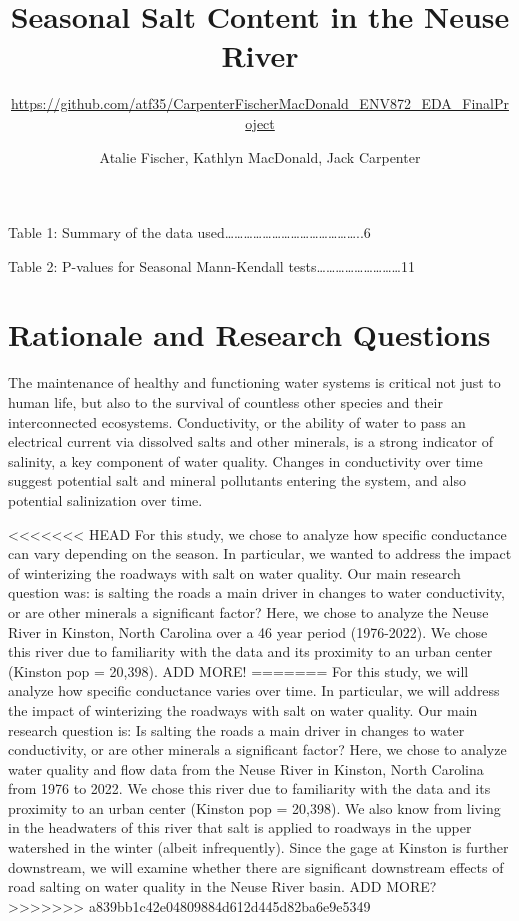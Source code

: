 \documentclass[
  12pt,
]{article}
\title{Seasonal Salt Content in the Neuse River}
\subtitle{\url{https://github.com/atf35/CarpenterFischerMacDonald_ENV872_EDA_FinalProject}}
\author{Atalie Fischer, Kathlyn MacDonald, Jack Carpenter}
\date{}
\begin{document}
\maketitle

{
\setcounter{tocdepth}{2}
\tableofcontents
}
\newpage

\listoftables

Table 1: Summary of the data
used\ldots\ldots\ldots\ldots\ldots\ldots\ldots\ldots\ldots\ldots\ldots\ldots\ldots\ldots..6

Table 2: P-values for Seasonal Mann-Kendall
tests\ldots\ldots\ldots\ldots\ldots\ldots\ldots\ldots\ldots11 \newpage

\listoffigures 
\newpage

\hypertarget{rationale-and-research-questions}{%
\section{Rationale and Research
Questions}\label{rationale-and-research-questions}}

The maintenance of healthy and functioning water systems is critical not
just to human life, but also to the survival of countless other species
and their interconnected ecosystems. Conductivity, or the ability of
water to pass an electrical current via dissolved salts and other
minerals, is a strong indicator of salinity, a key component of water
quality. Changes in conductivity over time suggest potential salt and
mineral pollutants entering the system, and also potential salinization
over time.

\textless\textless\textless\textless\textless\textless\textless{} HEAD
For this study, we chose to analyze how specific conductance can vary
depending on the season. In particular, we wanted to address the impact
of winterizing the roadways with salt on water quality. Our main
research question was: is salting the roads a main driver in changes to
water conductivity, or are other minerals a significant factor? Here, we
chose to analyze the Neuse River in Kinston, North Carolina over a 46
year period (1976-2022). We chose this river due to familiarity with the
data and its proximity to an urban center (Kinston pop = 20,398). ADD
MORE! ======= For this study, we will analyze how specific conductance
varies over time. In particular, we will address the impact of
winterizing the roadways with salt on water quality. Our main research
question is: Is salting the roads a main driver in changes to water
conductivity, or are other minerals a significant factor? Here, we chose
to analyze water quality and flow data from the Neuse River in Kinston,
North Carolina from 1976 to 2022. We chose this river due to familiarity
with the data and its proximity to an urban center (Kinston pop =
20,398). We also know from living in the headwaters of this river that
salt is applied to roadways in the upper watershed in the winter (albeit
infrequently). Since the gage at Kinston is further downstream, we will
examine whether there are significant downstream effects of road salting
on water quality in the Neuse River basin. ADD MORE?
\textgreater\textgreater\textgreater\textgreater\textgreater\textgreater\textgreater{}
a839bb1c42e04809884d612d445d82ba6e9e5349
\end{document}
